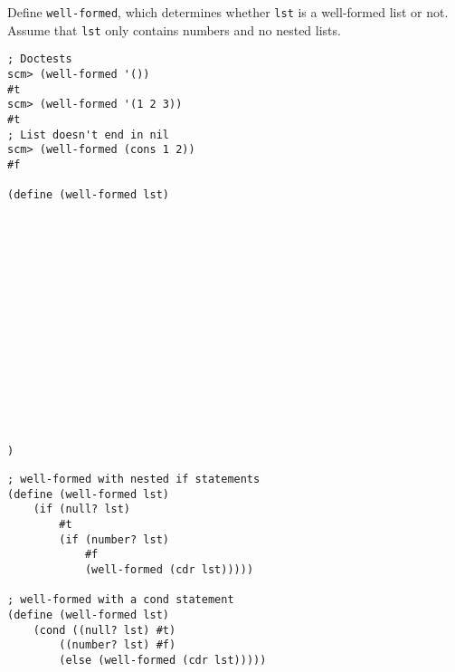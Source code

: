 \begin{blocksection}
\question Define \lstinline$well-formed$, which determines whether \lstinline$lst$ is a well-formed list or not. Assume that \lstinline$lst$ only contains numbers
and no nested lists.

\begin{lstlisting}
; Doctests
scm> (well-formed '())
#t
scm> (well-formed '(1 2 3))
#t
; List doesn't end in nil
scm> (well-formed (cons 1 2))
#f

(define (well-formed lst)
    















)
\end{lstlisting}
\end{blocksection}
\begin{blocksection}
\newpage
\begin{solution}[1.5in]
\begin{lstlisting}
; well-formed with nested if statements
(define (well-formed lst)
    (if (null? lst)
        #t
        (if (number? lst)
            #f
            (well-formed (cdr lst)))))

; well-formed with a cond statement
(define (well-formed lst)
    (cond ((null? lst) #t)
        ((number? lst) #f)
        (else (well-formed (cdr lst)))))
\end{lstlisting}
\end{solution}
\end{blocksection}

